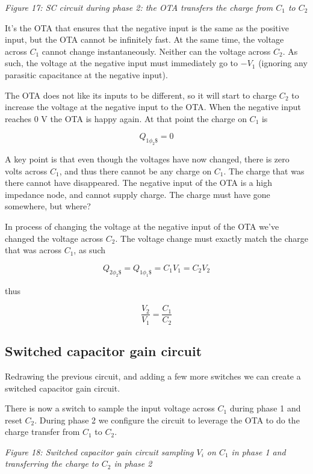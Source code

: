 {
\centering
{}
}

\emph{Figure 17: SC circuit during phase 2: the OTA transfers the charge
from \(C_1\) to \(C_2\)}

It's the OTA that ensures that the negative input is the same as the
positive input, but the OTA cannot be infinitely fast. At the same time,
the voltage across \(C_1\) cannot change instantaneously. Neither can
the voltage across \(C_2\). As such, the voltage at the negative input
must immediately go to \(-V_1\) (ignoring any parasitic capacitance at
the negative input).

The OTA does not like its inputs to be different, so it will start to
charge \(C_2\) to increase the voltage at the negative input to the OTA.
When the negative input reaches 0 V the OTA is happy again. At that
point the charge on \(C_1\) is

\[Q_{1\phi_2\$} = 0\]

A key point is that even though the voltages have now changed, there is
zero volts across \(C_1\), and thus there cannot be any charge on
\(C_1\). The charge that was there cannot have disappeared. The negative
input of the OTA is a high impedance node, and cannot supply charge. The
charge must have gone somewhere, but where?

In process of changing the voltage at the negative input of the OTA
we've changed the voltage across \(C_2\). The voltage change must
exactly match the charge that was across \(C_1\), as such

\[ Q_{2\phi_2\$} = Q_{1\phi_1\$} = C_1 V_1 = C_2 V_2\]

thus

\[ \frac{V_2}{V_1} = \frac{C_1}{C_2}\]

\subsection{Switched capacitor gain
circuit}\label{switched-capacitor-gain-circuit}

Redrawing the previous circuit, and adding a few more switches we can
create a switched capacitor gain circuit.

There is now a switch to sample the input voltage across \(C_1\) during
phase 1 and reset \(C_2\). During phase 2 we configure the circuit to
leverage the OTA to do the charge transfer from \(C_1\) to \(C_2\).


{
\centering
{}
}

\emph{Figure 18: Switched capacitor gain circuit sampling \(V_i\) on
\(C_1\) in phase 1 and transferring the charge to \(C_2\) in phase 2}

